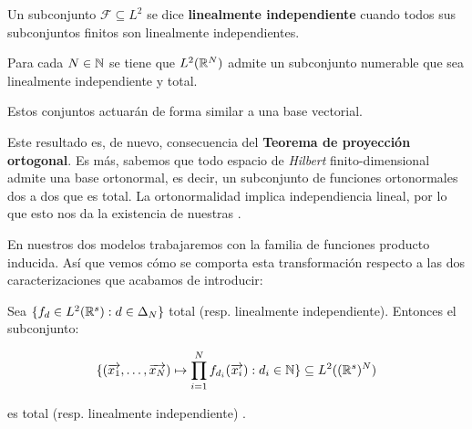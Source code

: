 \begin{definicion}

    Un subconjunto $\mathcal{F} \subseteq L^2$ se dice \textbf{linealmente independiente} cuando todos sus subconjuntos finitos son linealmente independientes.

\end{definicion}

\begin{proposicion}
    Para cada $N \in \mathbb{N}$ se tiene que $L^2(\mathbb{R}^N)$ admite un subconjunto numerable que sea linealmente independiente y total.
\end{proposicion}

\begin{observacion}
    Estos conjuntos actuarán de forma similar a una base vectorial.
\end{observacion}

\begin{observacion}

    Este resultado es, de nuevo, consecuencia del \textbf{Teorema de proyección ortogonal}. Es más, sabemos que todo espacio de \textit{Hilbert} finito-dimensional admite una base ortonormal, es decir, un subconjunto de funciones ortonormales dos a dos que es total. La ortonormalidad implica independiencia lineal, por lo que esto nos da la existencia de nuestras .

\end{observacion}

En nuestros dos modelos trabajaremos con la familia de funciones producto inducida. Así que vemos cómo se comporta esta transformación respecto a las dos caracterizaciones que acabamos de introducir:

\begin{proposicion} \label{prop:conservacion_totalidad_indp_lineal_func_prod}
    Sea $\{ f_d \in L^2(\mathbb{R}^s): d \in \Delta_{N}  \}$ total (resp. linealmente independiente). Entonces el subconjunto:

    \begin{equation}
        \{ (\overrightarrow{x_1}, \ldots, \overrightarrow{x_N}) \mapsto \prod_{i = 1}^N f_{d_i}(\overrightarrow{x_i}): d_i \in \mathbb{N} \} \subseteq L^2((\mathbb{R}^s)^N)
    \end{equation}

    es total (resp. linealmente independiente) \cite{matematicas:descomposicion_ht}.
\end{proposicion}

